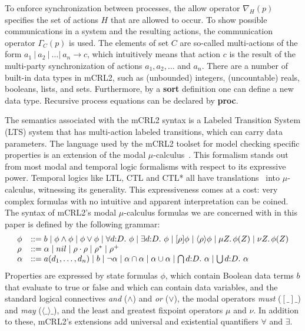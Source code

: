 \documentclass[letter]{llncs}
\begin{document}
To enforce synchronization between processes, the allow operator ${\nabla_H(p)}$ specifies the set of actions $H$ that are allowed
to occur. To show possible communications in a system and the resulting actions, the communication operator
${\Gamma_C(p)}$ is used. The elements of set $C$ are so-called multi-actions of the form $a_1\ |\ a_2\ |\ \dots |\ a_n \rightarrow c$, which intuitively
means that action $c$ is the result of the multi-party synchronization of actions $a_1 , a_2 , \dots $ and $a_n$.
There are a number of built-in data types in mCRL2, such as (unbounded) integers, (uncountable)
reals, booleans, lists, and sets. 
Furthermore, by a \textbf{sort} definition one can define a new data type. Recursive process 
equations can be declared by \textbf{proc}.

The semantics associated with the mCRL2 syntax is a Labeled Transition System (LTS)
system that has multi-action labeled transitions, which can carry data parameters. The language used by the mCRL2
toolset for model checking specific properties is an extension of the modal
$\mu$-calculus~\cite{Emerson97modelchecking}. This formalism stands out from most modal and temporal logic formalisms with respect to its
expressive power. Temporal logics like LTL, CTL and CTL* all have translations~\cite{cranen2010linear,cranen2011linear} into $\mu$-calculus,
witnessing its generality. This expressiveness comes at a cost: very complex formulas with no intuitive and apparent interpretation can be coined. 
The syntax of mCRL2's modal $\mu$-calculus formulas we are concerned with in this paper
is defined by the following grammar:
\[
\begin{array}{ll}
\phi & ::= b \mid \phi\wedge\phi \mid \phi\vee\phi \mid \forall d{:}D.~\phi \mid \exists d{:}D.~\phi
\mid [\rho]\phi \mid \langle\rho\rangle\phi \mid \mu Z\ldotp\phi(Z) \mid \nu Z\ldotp\phi(Z) \\
\rho & ::= \alpha \mid nil \mid \rho\cdot\rho \mid \rho^* \mid \rho^+ \\
\alpha & ::= a(d_1,\dots,d_n) \mid b \mid \neg \alpha \mid \alpha\cap\alpha \mid 
\alpha\cup\alpha \mid \bigcap{d{:}D}.~\alpha \mid \bigcup{d{:}D}.~\alpha \\
\end{array}
\]
Properties are expressed by state formulas $\phi$, which contain
Boolean data terms $b$ that evaluate to true or false and which can contain data variables, and the
standard logical connectives \emph{and} ($\land$) and \emph{or}
($\lor$), the modal operators \emph{must} ($[\_]\_$) and \emph{may}
($\langle \_\rangle\_$), and the least and greatest fixpoint operators
$\mu$ and $\nu$. In addition to these, mCRL2's extensions add universal
and existential quantifiers $\forall$ and $\exists$.
\end{document}

